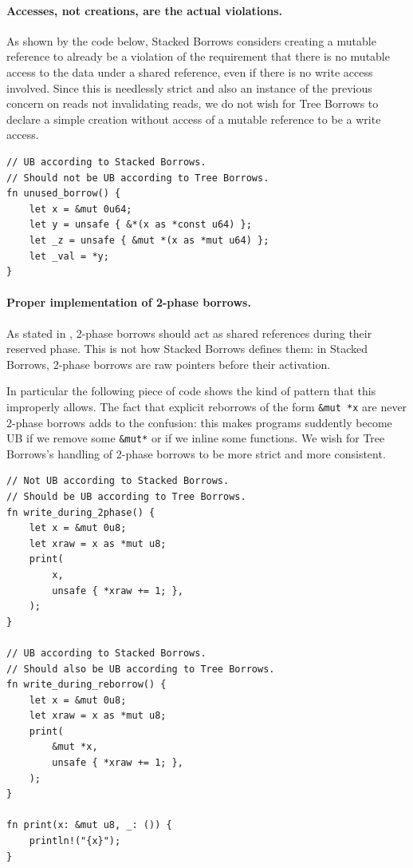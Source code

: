 \documentclass[a4paper,11pt]{article}
\theoremstyle{plain}
\theoremstyle{definition}
\theoremstyle{remark}
\newcommand{\tcode}[1]{\texttt{#1}}
\begin{document}
\paragraph*{Accesses, not creations, are the actual violations.}
As shown by the code below, Stacked Borrows considers creating a mutable reference
to already be a violation of the requirement that there is no mutable access to
the data under a shared reference, even if there is no write access involved.
Since this is needlessly strict and also an instance of the previous concern on
reads not invalidating reads, we do not wish for Tree Borrows to declare a simple
creation without access of a mutable reference to be a write access.
\begin{lstlisting}
// UB according to Stacked Borrows.
// Should not be UB according to Tree Borrows.
fn unused_borrow() {
    let x = &mut 0u64;
    let y = unsafe { &*(x as *const u64) };
    let _z = unsafe { &mut *(x as *mut u64) };
    let _val = *y;
}
\end{lstlisting}

\paragraph*{Proper implementation of 2-phase borrows.}
As stated in \cite{rustc_dev_guide}, 2-phase borrows should act as shared references
during their reserved phase. This is not how Stacked Borrows defines them: in
Stacked Borrows, 2-phase borrows are raw pointers before their activation.

In particular the following piece of code shows the kind of pattern that this
improperly allows. The fact that explicit reborrows of the form \tcode{\&mut *x}
are never 2-phase borrows adds to the confusion: this makes programs suddently
become UB if we remove some \tcode{\&mut*} or if we inline some functions.
We wish for Tree Borrows's handling of 2-phase borrows to be more strict and
more consistent.
\begin{lstlisting}
// Not UB according to Stacked Borrows.
// Should be UB according to Tree Borrows.
fn write_during_2phase() {
    let x = &mut 0u8;
    let xraw = x as *mut u8;
    print(
        x,
        unsafe { *xraw += 1; },
    );
}

// UB according to Stacked Borrows.
// Should also be UB according to Tree Borrows.
fn write_during_reborrow() {
    let x = &mut 0u8;
    let xraw = x as *mut u8;
    print(
        &mut *x,
        unsafe { *xraw += 1; },
    );
}

fn print(x: &mut u8, _: ()) {
    println!("{x}");
}
\end{lstlisting}
\end{document}
